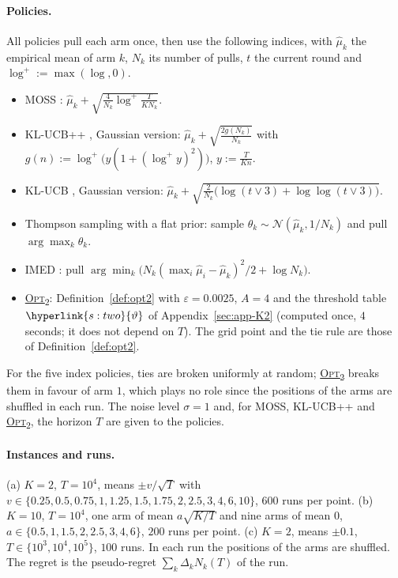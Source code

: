 \documentclass[11pt]{article}
\DeclareRobustCommand{\sy}[2]{{\hyperlink{#1}{#2}}}
\newcommand{\1}{\mathbf{1}}
\newcommand{\OPT}{\sy{alg:opt}{\textsc{Opt}\textsubscript{2}}}
\newcommand{\thr}{\sy{s:two}{\vartheta}}
\begin{document}
\paragraph{Policies.} All policies pull each arm once, then use the following indices, with $\hat\mu_k$ the empirical mean of arm $k$, $N_k$ its number of pulls,
$t$ the current round and $\log^+:=\max(\log,0)$.
\begin{itemize}
\item MOSS \citep[Section~9.1, Algorithm~7 of the online edition]{LS}: $\hat\mu_k+\sqrt{\frac4{N_k}\log^+\frac T{KN_k}}$.
\item KL-UCB++ \citep{MG17}, Gaussian version: $\hat\mu_k+\sqrt{\frac{2g(N_k)}{N_k}}$ with $g(n):=\log^+\big(y(1+(\log^+y)^2)\big)$, $y:=\frac T{Kn}$.
\item KL-UCB \citep{CGMMS13}, Gaussian version: $\hat\mu_k+\sqrt{\frac2{N_k}\big(\log(t\vee3)+\log\log(t\vee3)\big)}$.
\item Thompson sampling \citep{AG13} with a flat prior: sample $\theta_k\sim\mathcal N(\hat\mu_k,1/N_k)$ and pull $\arg\max_k\theta_k$.
\item IMED \citep{HT15}: pull $\arg\min_k\big(N_k(\max_i\hat\mu_i-\hat\mu_k)^2/2+\log N_k\big)$.
\item \OPT: Definition~\ref{def:opt2} with $\varepsilon=0.0025$, $A=4$ and the threshold table $\thr$ of Appendix~\ref{sec:app-K2} (computed once, $4$ seconds; it does not
depend on $T$). The grid point and the tie rule are those of Definition~\ref{def:opt2}.
\end{itemize}
For the five index policies, ties are broken uniformly at random; \OPT{} breaks them in favour of arm $1$, which plays no role since the positions of the arms
are shuffled in each run. The noise level $\sigma=1$ and, for MOSS, KL-UCB++ and \OPT, the horizon $T$ are given to the policies.

\paragraph{Instances and runs.} (a) $K=2$, $T=10^4$, means $\pm v/\sqrt T$ with $v\in\{0.25,0.5,0.75,1,1.25,1.5,1.75,2,2.5,3,4,6,10\}$, $600$ runs per point.
(b) $K=10$, $T=10^4$, one arm of mean $a\sqrt{K/T}$ and nine arms of mean $0$, $a\in\{0.5,1,1.5,2,2.5,3,4,6\}$, $200$ runs per point. (c) $K=2$, means $\pm0.1$,
$T\in\{10^3,10^4,10^5\}$, $100$ runs. In each run the positions of the arms are shuffled. The regret is the pseudo-regret $\sum_k\Delta_kN_k(T)$ of the run.
\end{document}
